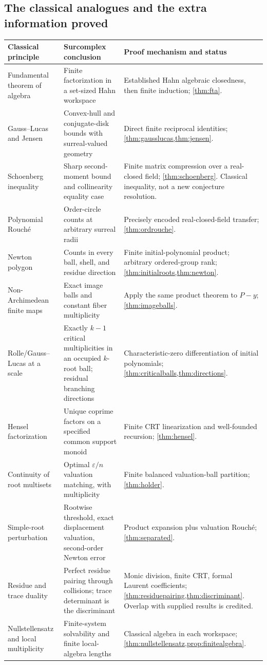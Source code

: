 \documentclass[11pt,letterpaper]{article}
\numberwithin{equation}{section}
\theoremstyle{definition}
\theoremstyle{remark}\newtheorem{remark}[theorem]{Remark}
\begin{document}
\subsection{The classical analogues and the extra information proved}
\begin{longtable}{@{}P{0.26\textwidth}P{0.30\textwidth}P{0.35\textwidth}@{}}
\toprule
Classical principle & Surcomplex conclusion & Proof mechanism and status\\
\midrule
\endhead
Fundamental theorem of algebra & Finite factorization in a set-sized
Hahn workspace & Established Hahn algebraic closedness, then finite
induction; \cref{thm:fta}.\\[0.5em]
Gauss--Lucas and Jensen & Convex-hull and conjugate-disk bounds with
surreal-valued geometry & Direct finite reciprocal identities;
\cref{thm:gausslucas,thm:jensen}.\\[0.5em]
Schoenberg inequality & Sharp second-moment bound and collinearity
equality case & Finite matrix compression over a real-closed field;
\cref{thm:schoenberg}. Classical inequality, not a new conjecture
resolution.\\[0.5em]
Polynomial Rouch\'e & Order-circle counts at arbitrary surreal radii &
Precisely encoded real-closed-field transfer;
\cref{thm:ordrouche}.\\[0.5em]
Newton polygon & Counts in every ball, shell, and residue direction &
Finite initial-polynomial product; arbitrary ordered-group rank;
\cref{thm:initialroots,thm:newton}.\\[0.5em]
Non-Archimedean finite maps & Exact image balls and constant fiber
multiplicity & Apply the same product theorem to $P-y$;
\cref{thm:imageballs}.\\[0.5em]
Rolle/Gauss--Lucas at a scale & Exactly $k-1$ critical multiplicities
in an occupied $k$-root ball; residual branching directions &
Characteristic-zero differentiation of initial polynomials;
\cref{thm:criticalballs,thm:directions}.\\[0.5em]
Hensel factorization & Unique coprime factors on a specified common
support monoid & Finite CRT linearization and well-founded recursion;
\cref{thm:hensel}.\\[0.5em]
Continuity of root multisets & Optimal $\varepsilon/n$ valuation
matching, with multiplicity & Finite balanced valuation-ball partition;
\cref{thm:holder}.\\[0.5em]
Simple-root perturbation & Rootwise threshold, exact displacement
valuation, second-order Newton error & Product expansion plus
valuation Rouch\'e; \cref{thm:separated}.\\[0.5em]
Residue and trace duality & Perfect residue pairing through collisions;
trace determinant is the discriminant & Monic division, finite CRT,
formal Laurent coefficients; \cref{thm:residuepairing,thm:discriminant}.
Overlap with supplied results is credited.\\[0.5em]
Nullstellensatz and local multiplicity & Finite-system solvability and
finite local-algebra lengths & Classical algebra in each workspace;
\cref{thm:nullstellensatz,prop:finitealgebra}.\\
\bottomrule
\end{longtable}
\end{document}
